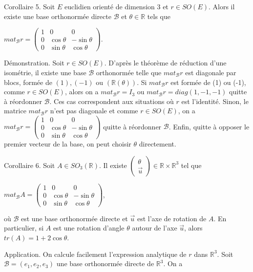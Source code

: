 Corollaire 5. Soit $E$ euclidien orienté de dimension 3 et $r \in SO(E)$. Alors il existe une base orthonormée directe $\mathcal{B}$ et $\theta \in \mathbb{R}$ tels que

$mat_{\mathcal{B}} r = \begin{pmatrix} 1 & 0 & 0 \\ 0 & \cos \theta & -\sin \theta \\ 0 & \sin \theta & \cos \theta \end{pmatrix}$.

Démonstration. Soit $r \in SO(E)$. D'après le théorème de réduction d'une isométrie, il existe une base $\mathcal{B}$ orthonormée telle que $mat_{\mathcal{B}} r$ est diagonale par blocs, formée de $(1), (-1)$ ou $(\mathbb{R}(\theta))$. Si $mat_{\mathcal{B}} r$ est formée de (1) ou (-1), comme $r \in SO(E)$, alors on a $mat_{\mathcal{B}} r = I_3$ ou $mat_{\mathcal{B}} r = diag(1, -1, -1)$ quitte à réordonner $\mathcal{B}$. Ces cas correspondent aux situations où $r$ est l'identité. Sinon, le matrice $mat_{\mathcal{B}} r$ n'est pas diagonale et comme $r \in SO(E)$, on a $mat_{\mathcal{B}} r = \begin{pmatrix} 1 & 0 & 0 \\ 0 & \cos \theta & -\sin \theta \\ 0 & \sin \theta & \cos \theta \end{pmatrix}$ quitte à réordonner $\mathcal{B}$. Enfin, quitte à opposer le premier vecteur de la base, on peut choisir $\theta$ directement.

Corollaire 6. Soit $A \in SO_3(\mathbb{R})$. Il existe $\begin{pmatrix} \theta \\ \vec{u} \end{pmatrix} \in \mathbb{R} \times \mathbb{R}^3$ tel que

$mat_{\mathcal{B}} A = \begin{pmatrix} 1 & 0 & 0 \\ 0 & \cos \theta & -\sin \theta \\ 0 & \sin \theta & \cos \theta \end{pmatrix}$,

où $\mathcal{B}$ est une base orthonormée directe et $\vec{u}$ est l'axe de rotation de $A$. En particulier, si $A$ est une rotation d'angle $\theta$ autour de l'axe $\vec{u}$, alors $tr(A) = 1 + 2\cos \theta$.

Application. On calcule facilement l'expression analytique de $r$ dans $\mathbb{R}^3$. Soit $\mathcal{B} = (e_1, e_2, e_3)$ une base orthonormée directe de $\mathbb{R}^3$. On a

